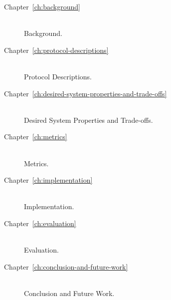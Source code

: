\begin{description}
    \item[Chapter~\ref{ch:background}] \hfill \\
        Background.
    \item[Chapter~\ref{ch:protocol-descriptions}] \hfill \\
        Protocol Descriptions.
    \item[Chapter~\ref{ch:desired-system-properties-and-trade-offs}] \hfill \\
        Desired System Properties and Trade-offs.
    \item[Chapter~\ref{ch:metrics}] \hfill \\
        Metrics.
    \item[Chapter~\ref{ch:implementation}] \hfill \\
        Implementation.
    \item[Chapter~\ref{ch:evaluation}] \hfill \\
        Evaluation.
    \item[Chapter~\ref{ch:conclusion-and-future-work}] \hfill \\
        Conclusion and Future Work.
\end{description}
